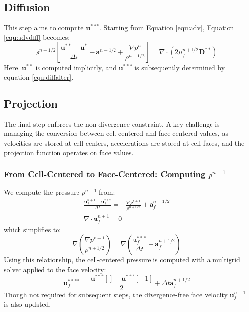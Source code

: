 \documentclass[a4paper]{article}
\begin{document}
\subsection{Diffusion}
This step aims to compute $\mathbf{u}^{***}$.  
Starting from Equation \ref{equ:adv}, Equation \ref{equ:advdiff} becomes:  
\begin{equation}
    \rho^{n+1/2} \left[ \frac{\mathbf{u}^{**} - \mathbf{u}^*}{\Delta t}  
    - \mathbf{a}^{n-1/2} 
    + \frac{\nabla p^n}{\rho^{n-1/2}} \right] 
    = \nabla \cdot \left( 2\mu^{n+1/2}_f \mathbf{D}^{**} \right)\label{equ:diff}
\end{equation}  
Here, $\mathbf{u}^{**}$ is computed implicitly, and $\mathbf{u}^{***}$ is subsequently determined by equation \ref{equ:diffalter}.

\subsection{Projection}

The final step enforces the non-divergence constraint. A key challenge is managing the conversion between cell-centered and face-centered values, as velocities are stored at cell centers, accelerations are stored at cell faces, and the projection function operates on face values.  

\subsubsection{From Cell-Centered to Face-Centered: Computing $p^{n+1}$}  

We compute the pressure $p^{n+1}$ from:  
\begin{gather}
    \frac{\mathbf{u}_f^{n+1} - \mathbf{u}_f^{***}}{\Delta t}
  = -\frac{\nabla p^{n+1}}{\rho^{n+1/2}} + \mathbf{a}_f^{n+1/2}\\
    \nabla\cdot\mathbf{u}_f^{n+1} = 0
\end{gather}  
which simplifies to:  
\begin{equation}
    \nabla\left(\frac{\nabla p^{n+1}}{\rho^{n+1/2}}\right) = \nabla\left(\frac{\mathbf{u}_f^{***}}{\Delta t} + \mathbf{a}_f^{n+1/2}\right)
\end{equation}  
Using this relationship, the cell-centered pressure is computed with a multigrid solver applied to the face velocity:  
\begin{equation}
    \mathbf{u}_f^{****} = \frac{\mathbf{u}^{***}[] + \mathbf{u}^{***}[-1]}{2}
  + \Delta t \mathbf{a}_f^{n+1/2}
\end{equation}  
Though not required for subsequent steps, the divergence-free face velocity $\mathbf{u}_f^{n+1}$ is also updated.  
\end{document}
